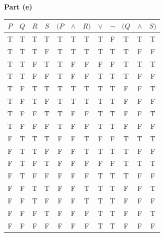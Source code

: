 \documentclass[11pt]{article}
\begin{document}
\begin{homeworkProblem}
\textbf{Part (e)} \\[0.25\baselineskip]
\begin{tabular}{@{}cccc|ccc>{\columncolor{bg!75}}ccccc@{}}
    \toprule
    $P$ & $Q$ & $R$ & $S$ & $(P$ & $\land$ & $R)$ & $\lor$ & $\lnot$ & $(Q$ & $\land$ & $S)$ \\ \midrule
    T   & T   & T   & T   & T    & T       & T    & T      & F       & T    & T       & T    \\
    T   & T   & T   & F   & T    & T       & T    & T      & T       & T    & F       & F    \\
    T   & T   & F   & T   & T    & F       & F    & F      & F       & T    & T       & T    \\
    T   & T   & F   & F   & T    & F       & F    & T      & T       & T    & F       & F    \\
    T   & F   & T   & T   & T    & T       & T    & T      & T       & F    & F       & T    \\
    T   & F   & T   & F   & T    & T       & T    & T      & T       & F    & F       & F    \\
    T   & F   & F   & T   & T    & F       & F    & T      & T       & F    & F       & T    \\
    T   & F   & F   & F   & T    & F       & F    & T      & T       & F    & F       & F    \\
    F   & T   & T   & T   & F    & F       & T    & F      & F       & T    & T       & T    \\
    F   & T   & T   & F   & F    & F       & T    & T      & T       & T    & F       & F    \\
    F   & T   & F   & T   & F    & F       & F    & F      & F       & T    & T       & T    \\
    F   & T   & F   & F   & F    & F       & F    & T      & T       & T    & F       & F    \\
    F   & F   & T   & T   & F    & F       & T    & T      & T       & F    & F       & T    \\
    F   & F   & T   & F   & F    & F       & T    & T      & T       & F    & F       & F    \\
    F   & F   & F   & T   & F    & F       & F    & T      & T       & F    & F       & T    \\
    F   & F   & F   & F   & F    & F       & F    & T      & T       & F    & F       & F    \\ \bottomrule
\end{tabular}


\end{homeworkProblem}
\end{document}
